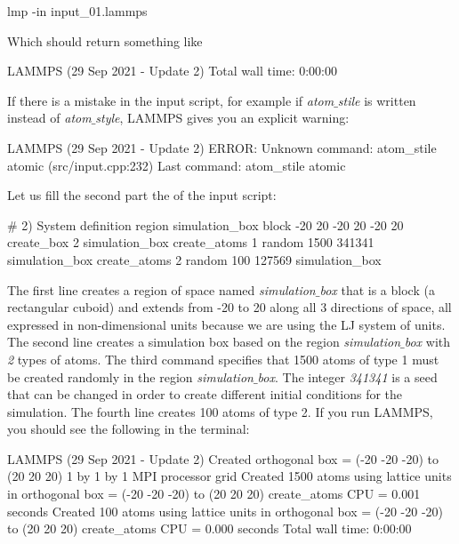 \begin{lcverbatim}
lmp -in input_01.lammps
\end{lcverbatim}

\noindent Which should return something like

\begin{lcverbatim}
LAMMPS (29 Sep 2021 - Update 2)
Total wall time: 0:00:00
\end{lcverbatim}

\noindent If there is a mistake in the input script, for example if
\textit{atom$\_$stile} is written instead of \textit{atom$\_$style}, LAMMPS
gives you an explicit warning:

\begin{lcverbatim}
LAMMPS (29 Sep 2021 - Update 2)
ERROR: Unknown command: atom_stile  atomic (src/input.cpp:232)
Last command: atom_stile atomic
\end{lcverbatim}

\noindent Let us fill the second part the of the input script:

\begin{lcverbatim}
# 2) System definition
region simulation_box block -20 20 -20 20 -20 20
create_box 2 simulation_box
create_atoms 1 random 1500 341341 simulation_box
create_atoms 2 random 100 127569 simulation_box
\end{lcverbatim}

\noindent The first line creates a region of space
named \textit{simulation$\_$box} that is a block (a rectangular cuboid) and
extends from -20 to 20 along all 3 directions of space, all expressed in
non-dimensional units because we are using the LJ system
of units. The second line creates a simulation box based on
the region \textit{simulation$\_$box} with \textit{2} types of atoms. The third
command specifies that 1500 atoms of type 1 must be created
randomly in the region \textit{simulation$\_$box}. The integer \textit{341341} is a
seed that can be changed in order to create different
initial conditions for the simulation. The fourth line
creates 100 atoms of type 2.
If you run LAMMPS, you should see the following in the
terminal:

\begin{lcverbatim}
LAMMPS (29 Sep 2021 - Update 2)
Created orthogonal box = (-20 -20 -20) to (20 20 20)
1 by 1 by 1 MPI processor grid
Created 1500 atoms
using lattice units in orthogonal box = (-20 -20 -20) to (20 20 20)
create_atoms CPU = 0.001 seconds
Created 100 atoms
using lattice units in orthogonal box = (-20 -20 -20) to (20 20 20)
create_atoms CPU = 0.000 seconds
Total wall time: 0:00:00
\end{lcverbatim}


